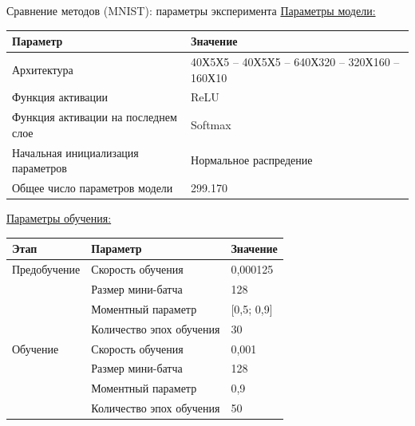 \documentclass[10pt]{beamer}
\begin{document}
        \begin{frame}{Сравнение методов (MNIST): параметры эксперимента}
            \underline{Параметры модели:}
            \begin{table}
            \small
            \begin{tabular}{|p{6cm}|p{5cm}|}
              \hline
                \textbf{Параметр} & \textbf{Значение}\\
                \hline
                Архитектура & 40Х5Х5 -- 40Х5Х5 -- 640Х320 -- 320Х160 -- 160Х10\\
                \hline
                Функция активации & ReLU \\
                \hline
                Функция активации на последнем слое & Softmax \\
                \hline
                Начальная инициализация параметров & Нормальное распредение \\
                \hline
                Общее число параметров модели & 299.170
                \\
                \hline
            \end{tabular}
            \end{table}\par
            \underline{Параметры обучения:}
            \begin{table}
            \small
            \begin{tabular}{|p{3cm}|p{5cm}|p{2cm}|}
              \hline
                \textbf{Этап} & \textbf{Параметр} & \textbf{Значение}\\
                \hline
                Предобучение & Скорость обучения & 0,000125\\
                \cline{2-3}
                & Размер мини-батча & 128 \\
                \cline{2-3}
                & Моментный параметр & [0,5; 0,9] \\
                \cline{2-3}
                & Количество эпох обучения & 30\\
                \hline
                Обучение & Скорость обучения & 0,001\\
                \cline{2-3}
                & Размер мини-батча & 128 \\
                \cline{2-3}
                & Моментный параметр & 0,9 \\
                \cline{2-3}
                & Количество эпох обучения & 50\\
                \hline
            \end{tabular}
            \end{table}
        \end{frame}
\end{document}
